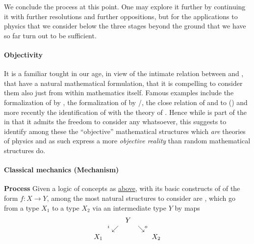 We conclude the process at this point. One may explore it further by continuing it with further resolutions and further oppositions, but for the applications to physics that we consider below the three stages beyond the ground that we have so far turn out to be sufficient.
\hypertarget{objectivity}{}\paragraph*{{Objectivity}}\label{objectivity}
It is a familiar tought in our age, in view of the intimate relation between  and , that  have a natural mathematical formulation, that it is compelling to consider them also just from within mathematics itself. Famous examples include the formalization of  by , the formalization of  by /, the close relation of  and  to  () and more recently the identification of  with the theory of .
Hence while  is part of the  in that it admits the freedom to consider any  whatsoever, this suggests to identify among these the ``objective'' mathematical structures which \emph{are} theories of physics and as such express a more \emph{objective reality} than random mathematical structures do.
\hypertarget{classical_mechanics_mechanism}{}\paragraph*{{Classical mechanics (Mechanism)}}\label{classical_mechanics_mechanism}
\textbf{Process}
Given a logic of concepts as \hyperlink{ConceptFormalization}{above}, with its basic constructs of  of the form $f \colon X \to Y$, among the most natural structures to consider are , which go from a type $X_1$ to a type $X_2$ via an intermediate type $Y$ by maps
\begin{displaymath}
\itexarray{
&& Y
\\
& {}^{\mathllap{i}}\swarrow && \searrow^{\mathrlap{o}}
\\
X_1 && && X_2
}
\end{displaymath}
